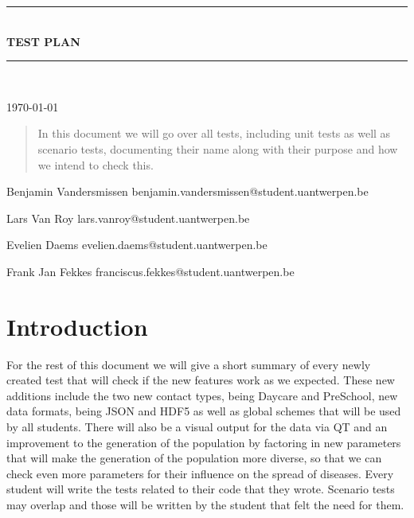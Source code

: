 \documentclass{article}
\newcommand{\HRule}[1]{\rule{\linewidth}{#1}}
\begin{document}
\begin{titlepage}
	\begin{center}
		\HRule{0.5pt} \\
		\LARGE \textbf{\uppercase{Test plan}}
		\HRule{2pt} \\ [0.5cm]
		{\normalsize \today \par}
		\vspace{2cm}
		\begin{abstract}
			\noindent
			In this document we will go over all tests, including unit tests as well as scenario tests, documenting their name along with their purpose and how we intend to check this.
			
		\end{abstract}
		\vfill
		\vfill
		{\normalsize Benjamin Vandersmissen \scriptsize benjamin.vandersmissen@student.uantwerpen.be \par}
		{\normalsize Lars Van Roy \scriptsize lars.vanroy@student.uantwerpen.be \par}
		{\normalsize Evelien Daems \scriptsize evelien.daems@student.uantwerpen.be \par}
		{\normalsize Frank Jan Fekkes \scriptsize franciscus.fekkes@student.uantwerpen.be \par}
	\end{center}
	
	\vfill
	
	\date{}
	
	\author{}
\end{titlepage}

\newpage

\tableofcontents

\newpage

\section{Introduction}
For the rest of this document we will give a short summary of every newly created test that will check if the new features work as we expected. These new additions include the two new contact types, being Daycare and PreSchool, new data formats, being JSON and HDF5 as well as global schemes that will be used by all students. There will also be a visual output for the data via QT and an improvement to the generation of the population by factoring in new parameters that will make the generation of the population more diverse, so that we can check even more parameters for their influence on the spread of diseases. Every student will write the tests related to their code that they wrote. Scenario tests may overlap and those will be written by the student that felt the need for them.
\end{document}
